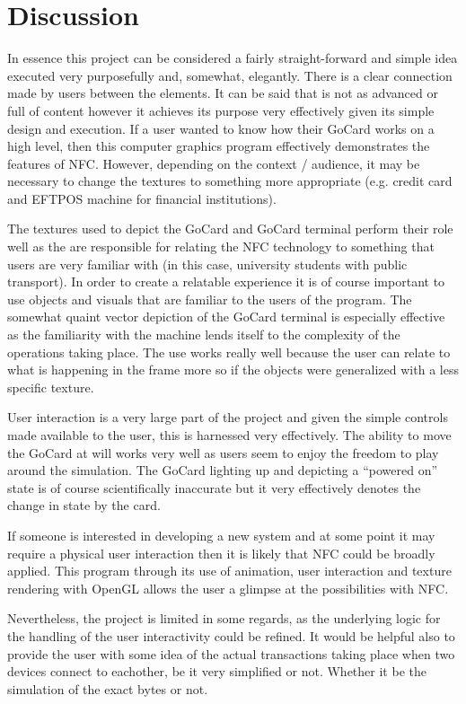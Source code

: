 \documentclass[a4paper]{article}
\begin{document}
\section{Discussion}
In essence this project can be considered a fairly straight-forward and simple idea executed very purposefully and, somewhat, elegantly. There is a clear connection made by users between the elements. It can be said that is not as advanced or full of content however it achieves its purpose very effectively given its simple design and execution. If a user wanted to know how their GoCard works on a high level, then this computer graphics program effectively demonstrates the features of NFC. However, depending on the context / audience, it may be necessary to change the textures to something more appropriate (e.g. credit card and EFTPOS machine for financial institutions). 

The textures used to depict the GoCard and GoCard terminal perform their role well as the are responsible for relating the NFC technology to something that users are very familiar with (in this case, university students with public transport). In order to create a relatable experience it is of course important to use objects and visuals that are familiar to the users of the program. The somewhat quaint vector depiction of the GoCard terminal is especially effective as the familiarity with the machine lends itself to the complexity of the operations taking place. The use works really well because the user can relate to what is happening in the frame more so if the objects were generalized with a less specific texture. 

User interaction is a very large part of the project and given the simple controls made available to the user, this is harnessed very effectively. The ability to move the GoCard at will works very well as users seem to enjoy the freedom to play around the simulation. The GoCard lighting up and depicting a ``powered on'' state is of course scientifically inaccurate but it very effectively denotes the change in state by the card.

If someone is interested in developing a new system and at some point it may require a physical user interaction then it is likely that NFC could be broadly applied. This program through its use of animation, user interaction and texture rendering with OpenGL allows the user a glimpse at the possibilities with NFC. 

Nevertheless, the project is limited in some regards, as the underlying logic for the handling of the user interactivity could be refined. It would be helpful also to provide the user with some idea of the actual transactions taking place when two devices connect to eachother, be it very simplified or not. Whether it be the simulation of the exact bytes or not. 
\end{document}
